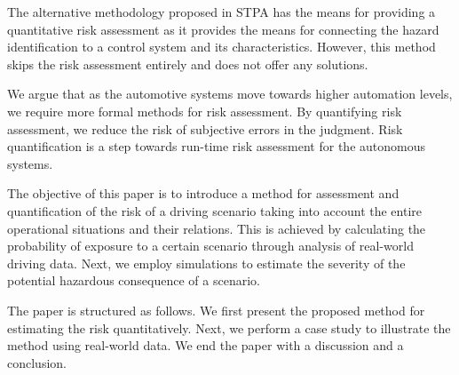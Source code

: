The alternative methodology proposed in STPA has the means for providing a quantitative risk assessment as it provides the means for connecting the hazard identification to a control system and its characteristics. However, this method skips the risk assessment entirely and does not offer any solutions. 

We argue that as the automotive systems move towards higher automation levels, we require more formal methods for risk assessment. By quantifying risk assessment, we reduce the risk of subjective errors in the judgment. Risk quantification is a step towards run-time risk assessment for the autonomous systems.  

The objective of this paper is to introduce a method for assessment and quantification of the risk of a driving scenario taking into account the entire operational situations and their relations. This is achieved by calculating the probability of exposure to a certain scenario through analysis of real-world driving data. Next, we employ simulations to estimate the severity of the potential hazardous consequence of a scenario.



The paper is structured as follows. We first present the proposed method for estimating the risk quantitatively. Next, we perform a case study to illustrate the method using real-world data. We end the paper with a discussion and a conclusion.
